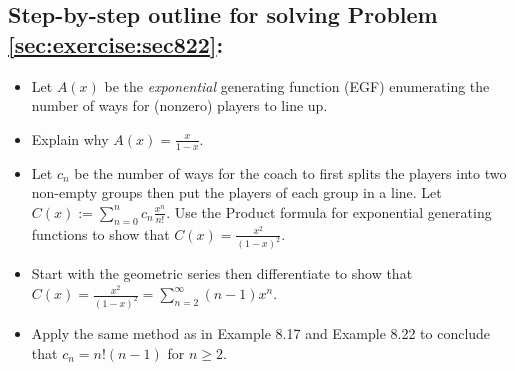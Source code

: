 \documentclass[12pt]{amsart}
\begin{document}
\newpage

\subsection*{Step-by-step outline for solving Problem \ref{sec:exercise:sec822}:}

\begin{itemize}
	\item 
	Let $A(x)$ be the \emph{exponential} generating function (EGF) enumerating the number of ways for (nonzero) players to line up.
	
	\item 
	Explain why $A(x)=\frac{x}{1-x}$.
	
	\item 
	Let $c_n$ be the number of ways for the coach to first splits the players into two non-empty groups then put the players of each group in a line. 
	Let $C(x):= \sum_{n=0}^n c_n \frac{x^n}{n!}$.
	Use the Product formula for exponential generating functions to show that
	$C(x)=\frac{x^2}{(1-x)^2}$.
	
	\item
	Start with the geometric series then differentiate to show that 
	$C(x)=\frac{x^2}{(1-x)^2}=\sum_{n=2}^\infty (n-1)x^n$.
	
	\item  
	Apply the same method as in Example 8.17 and Example 8.22 to conclude that $c_n= n! (n-1)$ for $n \geq 2$.
	
	
\end{itemize}
\end{document}
